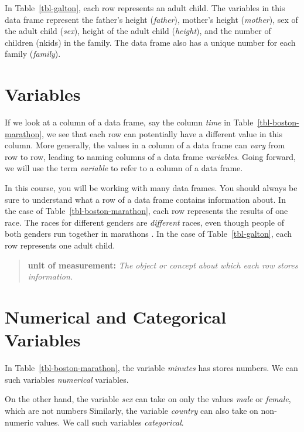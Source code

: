 \documentclass[
  12pt,
  letterpaper,
  DIV=11,
  numbers=noendperiod]{scrreprt}
\begin{document}
In Table~\ref{tbl-galton}, each row represents an adult child. The
variables in this data frame represent the father's height
(\emph{father}), mother's height (\emph{mother}), sex of the adult child
(\emph{sex}), height of the adult child (\emph{height}), and the number
of children (nkids) in the family. The data frame also has a unique
number for each family (\emph{family}).

\section{Variables}\label{sec-variables}

If we look at a column of a data frame, say the column \emph{time} in
Table~\ref{tbl-boston-marathon}, we see that each row can potentially
have a different value in this column. More generally, the values in a
column of a data frame can \emph{vary} from row to row, leading to
naming columns of a data frame \emph{variables}. Going forward, we will
use the term \emph{variable} to refer to a column of a data frame.

In this course, you will be working with many data frames. You should
always be sure to understand what a row of a data frame contains
information about. In the case of Table~\ref{tbl-boston-marathon}, each
row represents the results of one race. The races for different genders
are \emph{different} races, even though people of both genders run
together in marathons . In the case of Table~\ref{tbl-galton}, each row
represents one adult child.

\begin{quote}
\textbf{unit of measurement:} \emph{The object or concept about which
each row stores information.}
\end{quote}

\section{Numerical and Categorical
Variables}\label{numerical-and-categorical-variables}

In Table~\ref{tbl-boston-marathon}, the variable \emph{minutes} has
stores numbers. We can such variables \emph{numerical} variables.

On the other hand, the variable \emph{sex} can take on only the values
\emph{male} or \emph{female}, which are not numbers Similarly, the
variable \emph{country} can also take on non-numeric values. We call
such variables \emph{categorical}.
\end{document}
